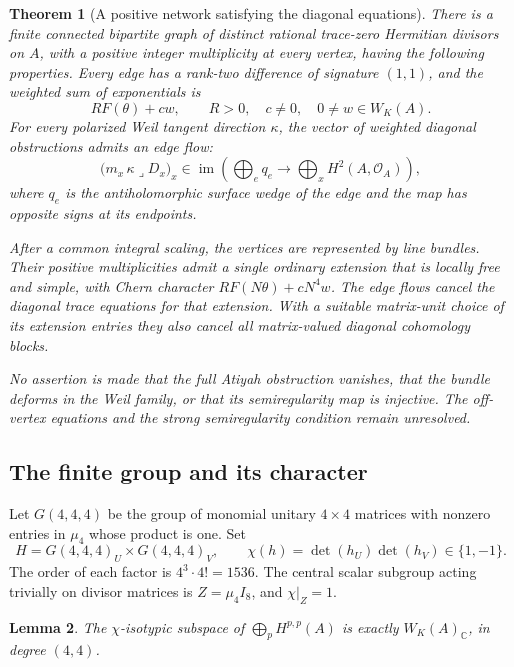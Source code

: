 \documentclass[11pt]{article}
\newtheorem{theorem}{Theorem}[section]
\newtheorem{lemma}[theorem]{Lemma}
\theoremstyle{definition}
\theoremstyle{remark}
\begin{document}
\begin{theorem}[A positive network satisfying the diagonal equations]
\label{thm:gaussian-positive-trace-network}
There is a finite connected bipartite graph of distinct rational
trace-zero Hermitian divisors on \(A\), with a positive integer
multiplicity at every vertex, having the following properties.
Every edge has a rank-two difference of signature \((1,1)\), and
the weighted sum of exponentials is
\[
 R F(\theta)+c w,
 \qquad R>0,\quad c\ne0,\quad 0\ne w\in W_K(A).
\]
For every polarized Weil tangent direction \(\kappa\), the vector of
weighted diagonal obstructions admits an edge flow:
\begin{equation}
 \bigl(m_x\,\kappa\mathbin{\lrcorner}D_x\bigr)_x
 \in\operatorname{im}\left(
   \bigoplus_{e}q_e\longrightarrow\bigoplus_x H^2(A,\mathcal O_A)
 \right),
 \label{eq:positive-trace-flow}
\end{equation}
where \(q_e\) is the antiholomorphic surface wedge of the edge and
the map has opposite signs at its endpoints.

After a common integral scaling, the vertices are represented by
line bundles.  Their positive multiplicities admit a single ordinary
extension that is locally free and simple, with Chern character
\(R F(N\theta)+cN^4w\).  The edge flows cancel the diagonal trace
equations for that extension.  With a suitable matrix-unit choice of
its extension entries they also cancel all matrix-valued diagonal
cohomology blocks.

No assertion is made that the full Atiyah obstruction vanishes, that
the bundle deforms in the Weil family, or that its semiregularity map
is injective.  The off-vertex equations and the strong
semiregularity condition remain unresolved.
\end{theorem}

\subsection{The finite group and its character}

Let \(G(4,4,4)\) be the group of monomial unitary \(4\times4\)
matrices with nonzero entries in \(\mu_4\) whose product is one.
Set
\[
 H=G(4,4,4)_U\times G(4,4,4)_V,
 \qquad \chi(h)=\det(h_U)\det(h_V)\in\{1,-1\}.
\]
The order of each factor is \(4^3\cdot4!=1536\).
The central scalar subgroup acting trivially on divisor matrices is
\(Z=\mu_4 I_8\), and \(\chi|_Z=1\).

\begin{lemma}\label{lem:gaussian-trace-character}
The \(\chi\)-isotypic subspace of
\(\bigoplus_p H^{p,p}(A)\) is exactly \(W_K(A)_\mathbb C\), in
degree \((4,4)\).
\end{lemma}
\end{document}
